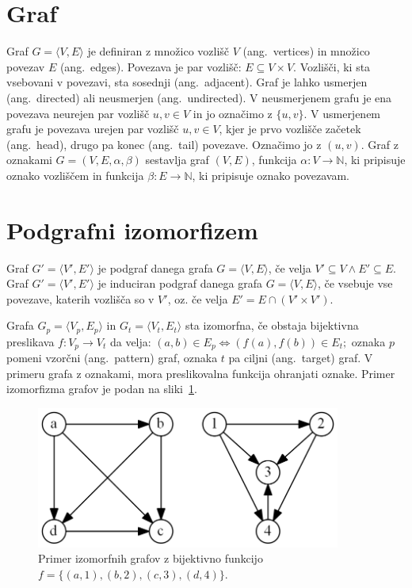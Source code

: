 \documentclass[a4paper, 12pt, ]{book}
\begin{document}
	\section{Graf}
	Graf $G = \langle V, E \rangle$ je definiran z množico vozlišč $V$ (ang.~vertices) in množico povezav $E$ (ang.~edges). Povezava je par vozlišč: 
	$E \subseteq V \times V$.
	Vozlišči, ki sta vsebovani v povezavi, sta sosednji (ang.~adjacent). Graf je lahko usmerjen (ang.~directed) ali neusmerjen
	(ang.~undirected). V neusmerjenem
	grafu je ena povezava neurejen par vozlišč $u, v \in V$ in jo označimo z $\{u, v\}$. V usmerjenem grafu je povezava urejen par 
	vozlišč $u, v \in V$, kjer je prvo vozlišče začetek (ang.~head), drugo pa konec (ang.~tail) povezave. Označimo jo z $(u, v)$.
	Graf z oznakami $G = (V, E, \alpha, \beta)$ sestavlja graf $(V, E)$, funkcija $\alpha: V \to \mathbb{N} $, ki pripisuje oznako
	vozliščem in funkcija $\beta: E \rightarrow \mathbb{N}$, ki pripisuje oznako povezavam.



	\section{Podgrafni izomorfizem}
	Graf $G' = \langle V', E' \rangle$ je podgraf danega grafa $G = \langle V, E \rangle$, če velja $V' \subseteq V \wedge E' \subseteq E$. 
	Graf $G' = \langle V', E' \rangle$ je induciran podgraf danega grafa $G = \langle V, E \rangle$, če vsebuje vse povezave, katerih vozlišča so
	v $V'$, oz. če velja $E' = E \cap (V' \times V')$.

	Grafa $G_p = \langle V_p, E_p \rangle $ in $G_t = \langle V_t, E_t \rangle$ sta izomorfna, če obstaja bijektivna preslikava $f: V_p \to V_t$ da velja: 
	$(a,b) \in E_p \Leftrightarrow (f(a), f(b)) \in E_t;$
	oznaka $p$ pomeni vzorčni (ang.~pattern) graf, oznaka $t$ pa ciljni (ang.~target) graf. V primeru grafa z oznakami, mora preslikovalna funkcija
	ohranjati oznake. Primer izomorfizma grafov je podan na sliki~\ref{pic_iso}.

	\begin{figure}
	\begin{center}
	\includegraphics[width=10cm]{img/graph_izomorph.png}
	\end{center}
	\caption{Primer izomorfnih grafov z bijektivno funkcijo $f = \{(a, 1), (b, 2), (c, 3), (d, 4)\}$.}
	\label{pic_iso}
	\end{figure}
\end{document}
